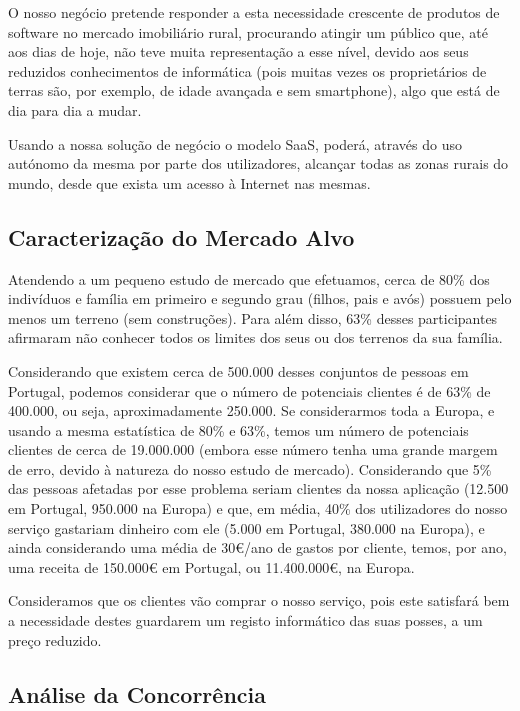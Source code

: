 \documentclass[11pt]{article}
\begin{document}
	\normalsize
	
	O nosso negócio pretende responder a esta necessidade crescente de produtos de software no mercado imobiliário rural, procurando atingir um público que, até aos dias de hoje, não teve muita representação a esse nível, devido aos seus reduzidos conhecimentos de informática (pois muitas vezes os proprietários de terras são, por exemplo, de idade avançada e sem smartphone), algo que está de dia para dia a mudar.
	
	Usando a nossa solução de negócio o modelo SaaS, poderá, através do uso autónomo da mesma por parte dos utilizadores, alcançar todas as zonas rurais do mundo, desde que exista um acesso à Internet nas mesmas.
	
	
	\large
	\subsection{Caracterização do Mercado Alvo}
	
	\normalsize
	
	Atendendo a um pequeno estudo de mercado que efetuamos, cerca de 80\% dos indivíduos e família em primeiro e segundo grau (filhos, pais e avós) possuem pelo menos um terreno (sem construções). Para além disso, 63\% desses participantes afirmaram não conhecer todos os limites dos seus ou dos terrenos da sua família.
	
	Considerando que existem cerca de 500.000 desses conjuntos de pessoas em Portugal, podemos considerar que o número de potenciais clientes é de 63\% de 400.000, ou seja, aproximadamente 250.000. Se considerarmos toda a Europa, e usando a mesma estatística de 80\% e 63\%, temos um número de potenciais clientes de cerca de 19.000.000 (embora esse número tenha uma grande margem de erro, devido à natureza do nosso estudo de mercado). Considerando que 5\% das pessoas afetadas por esse problema seriam clientes da nossa aplicação (12.500 em Portugal, 950.000 na Europa) e que, em média, 40\% dos utilizadores do nosso serviço gastariam dinheiro com ele (5.000 em Portugal, 380.000 na Europa), e ainda considerando uma média de 30€/ano de gastos por cliente, temos, por ano, uma receita de 150.000€ em Portugal, ou 11.400.000€, na Europa.
	
	Consideramos que os clientes vão comprar o nosso serviço, pois este satisfará bem a necessidade destes guardarem um registo informático das suas posses, a um preço reduzido.
	
	
	\large
	\subsection{Análise da Concorrência}
\end{document}
